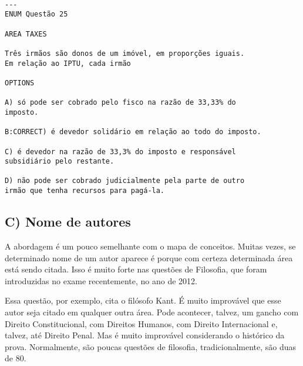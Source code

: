 \documentclass{article}
\begin{document}
\begin{verbatim}

---
ENUM Questão 25 

AREA TAXES
 
Três irmãos são donos de um imóvel, em proporções iguais. 
Em relação ao IPTU, cada irmão 
 
OPTIONS

A) só pode ser cobrado pelo fisco na razão de 33,33% do 
imposto. 

B:CORRECT) é devedor solidário em relação ao todo do imposto. 

C) é devedor na razão de 33,3% do imposto e responsável 
subsidiário pelo restante. 

D) não pode ser cobrado judicialmente pela parte de outro 
irmão que tenha recursos para pagá-la. 

\end{verbatim}

\subsection*{C) Nome de autores}

A abordagem é um pouco semelhante com o mapa de conceitos. Muitas vezes, se determinado nome de um autor aparece é porque com certeza determinada área está sendo citada. Isso é muito forte nas questões de Filosofia, que foram introduzidas no exame recentemente, no ano de 2012.

Essa questão, por exemplo, cita o filósofo Kant. É muito improvável que esse autor seja citado em qualquer outra área. Pode acontecer, talvez, um gancho com Direito Constitucional, com Direitos Humanos, com Direito Internacional e, talvez, até Direito Penal. Mas é muito improvável considerando o histórico da prova. Normalmente, são poucas questões de filosofia, tradicionalmente, são duas de 80.
\end{document}
